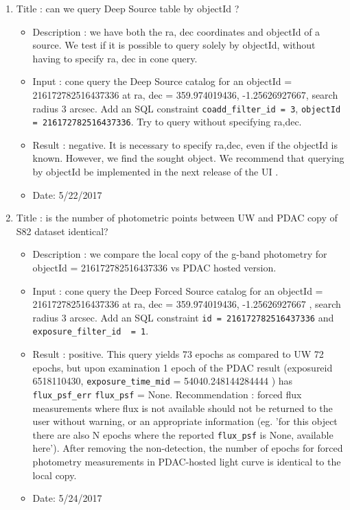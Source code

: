 \documentclass[DM,lsstdraft,toc]{lsstdoc}
\begin{document}
\begin{enumerate}
   \item Title : can we query Deep Source table by objectId ?
    \begin{itemize}
      \item Description : we have both the ra, dec coordinates and objectId of a source.  We test if it is possible to query solely by objectId, without having to specify ra, dec in cone query.
      \item Input : cone query the Deep Source catalog for an objectId = 216172782516437336 at ra, dec  = 359.974019436\degree,  -1.25626927667\degree , search radius 3 arcsec.  Add an   SQL constraint \verb|coadd_filter_id = 3|, \verb|objectId = 216172782516437336|. Try to query without specifying ra,dec.
      \item Result : negative.  It is necessary to specify ra,dec, even if the objectId is known.  However, we find the sought object. We recommend that querying by objectId  be implemented in the next release of the UI .
      \item Date: 5/22/2017
    \end{itemize}


      \item Title : is the number of photometric points between UW and PDAC copy of S82 dataset identical?
    \begin{itemize}
      \item Description : we compare the local copy of the g-band photometry for objectId = 216172782516437336 vs PDAC hosted version.
      \item Input : cone query the Deep Forced Source catalog for an objectId = 216172782516437336 at ra, dec  = 359.974019436,  -1.25626927667 , search radius 3 arcsec. Add an   SQL constraint \verb|id = 216172782516437336| and \verb|exposure_filter_id  = 1|.
      \item Result : positive. This query yields 73 epochs as compared to UW 72 epochs, but upon examination 1 epoch of the PDAC result (exposureid 6518110430, \verb|exposure_time_mid| = 54040.248144284444 )  has \verb|flux_psf_err|  \verb|flux_psf|  = None. Recommendation : forced flux measurements where flux is not available should not be returned to the user without warning, or an appropriate information (eg.  'for this object there are also N epochs where the reported \verb|flux_psf| is None, available here'). After removing the non-detection, the number of epochs for forced photometry measurements in PDAC-hosted light curve is identical to the local copy.
      \item Date: 5/24/2017
    \end{itemize}


\end{enumerate}
\end{document}
